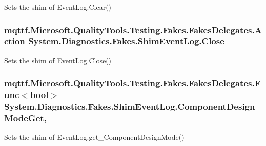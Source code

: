 Sets the shim of Event\-Log.\-Clear()

\hypertarget{class_system_1_1_diagnostics_1_1_fakes_1_1_shim_event_log_acdfd3f6eac68a4abbd98de13939d62fe}{
\subsubsection[{Close}]{\setlength{\rightskip}{0pt plus 5cm}mqttf.\-Microsoft.\-Quality\-Tools.\-Testing.\-Fakes.\-Fakes\-Delegates.\-Action System.\-Diagnostics.\-Fakes.\-Shim\-Event\-Log.\-Close\hspace{0.3cm}{\ttfamily [set]}}}\label{class_system_1_1_diagnostics_1_1_fakes_1_1_shim_event_log_acdfd3f6eac68a4abbd98de13939d62fe}


Sets the shim of Event\-Log.\-Close()

\hypertarget{class_system_1_1_diagnostics_1_1_fakes_1_1_shim_event_log_abe2f78e947fc17eebe7bdcee043d7317}{
\subsubsection[{Component\-Design\-Mode\-Get}]{\setlength{\rightskip}{0pt plus 5cm}mqttf.\-Microsoft.\-Quality\-Tools.\-Testing.\-Fakes.\-Fakes\-Delegates.\-Func$<$bool$>$ System.\-Diagnostics.\-Fakes.\-Shim\-Event\-Log.\-Component\-Design\-Mode\-Get\hspace{0.3cm}{\ttfamily [get]}, {\ttfamily [set]}}}\label{class_system_1_1_diagnostics_1_1_fakes_1_1_shim_event_log_abe2f78e947fc17eebe7bdcee043d7317}


Sets the shim of Event\-Log.\-get\-\_\-\-Component\-Design\-Mode()

